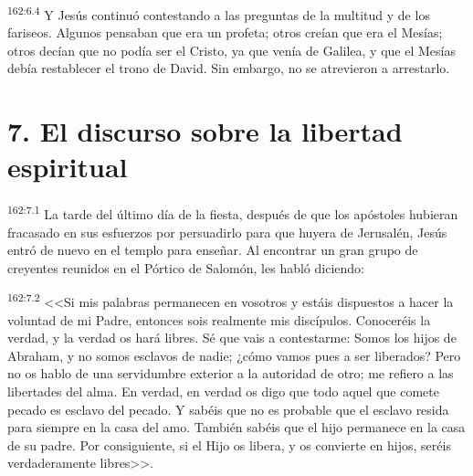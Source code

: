 \par 
\textsuperscript{162:6.4} Y Jesús continuó contestando a las preguntas de la multitud y de los fariseos. Algunos pensaban que era un profeta; otros creían que era el Mesías; otros decían que no podía ser el Cristo, ya que venía de Galilea, y que el Mesías debía restablecer el trono de David. Sin embargo, no se atrevieron a arrestarlo.

\section*{7. El discurso sobre la libertad espiritual}
\par 
\textsuperscript{162:7.1} La tarde del último día de la fiesta, después de que los apóstoles hubieran fracasado en sus esfuerzos por persuadirlo para que huyera de Jerusalén, Jesús entró de nuevo en el templo para enseñar. Al encontrar un gran grupo de creyentes reunidos en el Pórtico de Salomón, les habló diciendo:

\par 
\textsuperscript{162:7.2} <<Si mis palabras permanecen en vosotros y estáis dispuestos a hacer la voluntad de mi Padre, entonces sois realmente mis discípulos. Conoceréis la verdad, y la verdad os hará libres. Sé que vais a contestarme: Somos los hijos de Abraham, y no somos esclavos de nadie; ¿cómo vamos pues a ser liberados? Pero no os hablo de una servidumbre exterior a la autoridad de otro; me refiero a las libertades del alma. En verdad, en verdad os digo que todo aquel que comete pecado es esclavo del pecado. Y sabéis que no es probable que el esclavo resida para siempre en la casa del amo. También sabéis que el hijo permanece en la casa de su padre. Por consiguiente, si el Hijo os libera, y os convierte en hijos, seréis verdaderamente libres>>.

